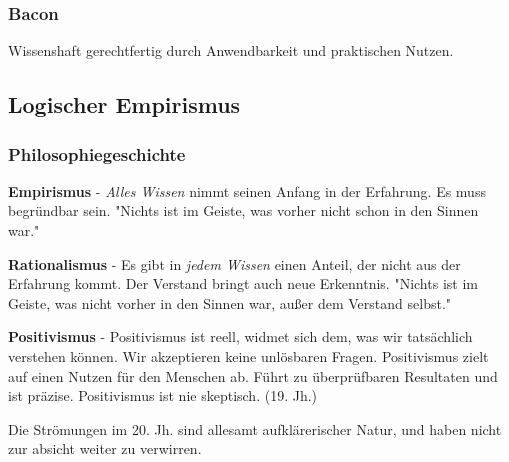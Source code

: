 \documentclass[11pt]{article}
\begin{document}
\subsubsection{Bacon}
\label{sec-3-1-3}

Wissenshaft gerechtfertig durch Anwendbarkeit und praktischen Nutzen.

\subsection{Logischer Empirismus}
\label{sec-3-2}

\subsubsection{Philosophiegeschichte}
\label{sec-3-2-1}

\textbf{Empirismus} - \emph{Alles Wissen} nimmt seinen Anfang in der Erfahrung. Es muss
begründbar sein. "Nichts ist im Geiste, was vorher nicht schon in den Sinnen
war."
\vspace{.3cm}

\noindent{}
\textbf{Rationalismus} - Es gibt in \emph{jedem Wissen} einen Anteil, der nicht aus der
Erfahrung kommt. Der Verstand bringt auch neue Erkenntnis. "Nichts ist im
Geiste, was nicht vorher in den Sinnen war, außer dem Verstand selbst."
\vspace{.3cm}

\noindent{}
\textbf{Positivismus} - Positivismus ist reell, widmet sich dem, was wir
 tatsächlich verstehen können. Wir akzeptieren keine unlösbaren
 Fragen. Positivismus zielt auf einen Nutzen für den Menschen ab. Führt zu
 überprüfbaren Resultaten und ist präzise. Positivismus ist nie
 skeptisch. (19. Jh.)
\vspace{.3cm}

Die Strömungen im 20. Jh. sind allesamt aufklärerischer Natur, und haben
nicht zur absicht weiter zu verwirren.
\end{document}
